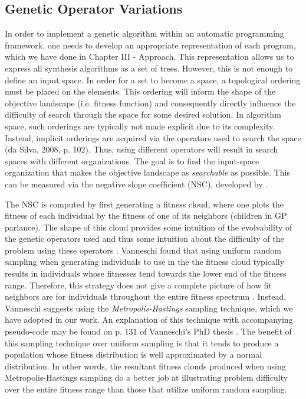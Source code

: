 \documentclass[12pt]{report} 	%
\numberwithin{figure}{chapter}
\numberwithin{table}{chapter}
\numberwithin{equation}{chapter}
\begin{document}
\begin{flushleft}
\section{Genetic Operator Variations}
In order to implement a genetic algorithm within an automatic programming framework, one needs to develop an appropriate representation of each program, which we have done in Chapter III - Approach. This representation allows us to express all synthesis algorithms as a set of trees. However, this is not enough to define an input space. In order for a set to become a space, a topological ordering must be placed on the elements. This ordering will inform the shape of the objective landscape (i.e. fitness function) and consequently directly influence the difficulty of search through the space for some desired solution. In algorithm space, such orderings are typically not made explicit due to its complexity. Instead, implicit orderings are acquired via the operators used to search the space (da Silva, 2008, p. 102). Thus, using different operators will result in search spaces with different organizations. The goal is to find the input-space organization that makes the objective landscape as \textit{searchable} as possible. This can be measured via the negative slope coefficient (NSC), developed by \cite[p. 54]{Vanneschi:2004le}.

The NSC is computed by first generating a fitness cloud, where one plots the fitness of each individual by the fitness of one of its neighbors (children in GP parlance). The shape of this cloud provides some intuition of the evolvability of the genetic operators used and thus some intuition about the difficulty of the problem using these operators \cite[p. 130]{Vanneschi:2004le}. Vanneschi found that using uniform random sampling when generating individuals to use in the the fitness cloud typically results in individuals whose fitnesses tend towards the lower end of the fitness range. Therefore, this strategy does not give a complete picture of how fit neighbors are for individuals throughout the entire fitness spectrum \cite[p. 132]{Vanneschi:2004le}. Instead, Vanneschi suggests using the \textit{Metropolis-Hastings} sampling technique, which we have adopted in our work. An explanation of this technique with accompanying pseudo-code may be found on p. 131 of Vanneschi's PhD thesis \cite{Vanneschi:2004le}. The benefit of this sampling technique over uniform sampling is that it tends to produce a population whose fitness distribution is well approximated by a normal distribution. In other words, the resultant fitness clouds produced when using Metropolis-Hastings sampling do a better job at illustrating problem difficulty over the entire fitness range than those that utilize uniform random sampling.


\end{flushleft}
\end{document}
